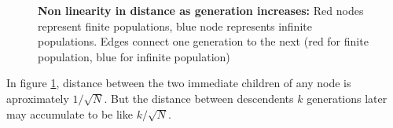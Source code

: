\begin{figure}[htp]
\begin{center}
\hspace{5pt}
\caption[\textbf{Non linearity in distance as generation increases}]{\textbf{Non linearity in distance as generation increases:} 
Red nodes represent finite populations, blue node represents infinite populations. 
Edges connect one generation to the next (red for finite population, blue for infinite population)}
\label{nonlinear}
\end{center}
\end{figure}
In figure \ref{nonlinear}, distance between the two immediate children of any node is aproximately $1/\sqrt{N}$. 
But the distance between descendents $k$ generations later may accumulate to be like $k/\sqrt{N}$. 

